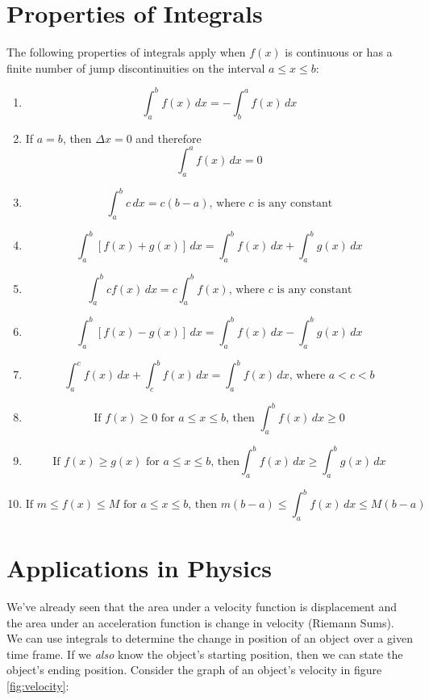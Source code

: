 \section{Properties of Integrals}
The following properties of integrals apply when $f(x)$ is continuous or has a finite number of jump discontinuities on the interval $a \leq x \leq b$:
\begin{enumerate}
\item $$\int_{a}^{b}f(x)\, dx = -\int_{b}^{a}f(x)\, dx$$ %
\item If $a=b$, then $\Delta x = 0$ and therefore $$\int_{a}^{a}f(x)\, dx = 0$$%
\item $$\int_{a}^{b}c\,dx = c(b-a)\text{, where }c\text{ is any constant}$$%
\item $$\int_{a}^{b}[f(x) + g(x)]\,dx = \int_{a}^{b}f(x)\,dx + \int_{a}^{b}g(x)\,dx$$%
\item $$\int_{a}^{b}cf(x)\,dx = c\int_{a}^{b}f(x)\text{, where }c\text{ is any constant}$$%
\item $$\int_{a}^{b}[f(x) - g(x)]\,dx = \int_{a}^{b}f(x)\,dx - \int_{a}^{b}g(x)\,dx$$%
\item $$\int_{a}^{c} f(x)\,dx + \int_{c}^{b}f(x)\,dx = \int_{a}^{b}f(x)\,dx\text{, where }a<c<b$$%
\item $$\text{If }f(x) \geq 0\text{ for }a\leq x\leq b\text{, then }\int_{a}^{b}f(x)\,dx \geq0$$%
\item $$\text{If }f(x)\geq g(x)\text{ for }a\leq x \leq b\text{, then}\int_{a}^{b}f(x)\,dx \geq \int_{a}^{b}g(x)\,dx$$%
\item $$\text{If } m \leq f(x) \leq M\text{ for }a\leq x \leq b\text{, then }m(b-a)\leq \int_{a}^{b}f(x)\,dx \leq M(b-a)$$%
\end{enumerate}


\section{Applications in Physics}
We've already seen that the area under a velocity function is displacement and the area under an acceleration function is change in velocity (Riemann Sums). We can use integrals to determine the change in position of an object over a given time frame. If we \textit{also} know the object's starting position, then we can state the object's ending position. Consider the graph of an object's velocity in figure \ref{fig:velocity}:

